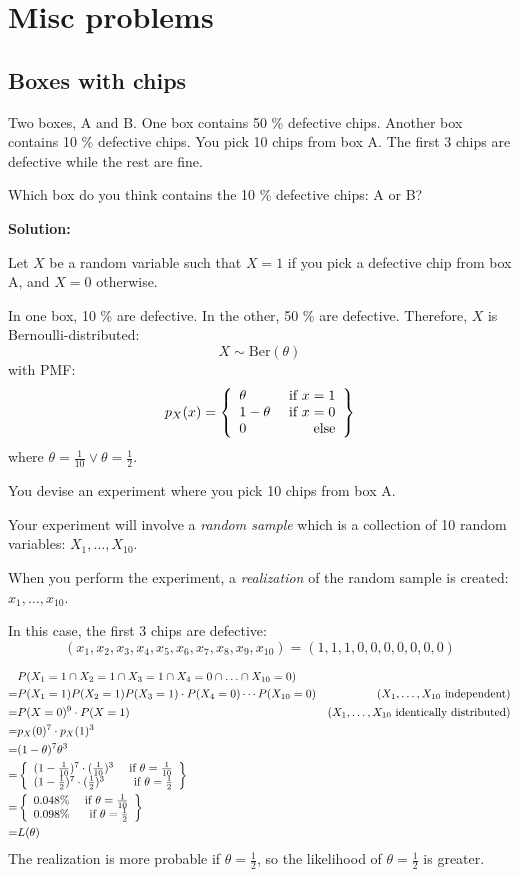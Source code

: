 \documentclass{article}
\begin{document}
\section{Misc problems}
\subsection{Boxes with chips}

Two boxes, A and B.
One box contains 50 \% defective chips. Another box contains 10 \% defective chips.
You pick 10 chips from box A. The first 3 chips are defective while the rest are fine.

Which box do you think contains the 10 \% defective chips: A or B?

\textbf{Solution:}

Let \(X\) be a random variable such that \(X=1\) if you pick a defective chip from box A, and \(X=0\) otherwise.

In one box, 10 \% are defective. In the other, 50 \% are defective. Therefore, \(X\) is Bernoulli-distributed:
\[X \sim \text{Ber}(\theta)\]
with PMF:
\[p_X(x) = \left\{\begin{array}{lr}\theta & \text{ if }x=1\\ 1-\theta & \text{ if }x=0 \\0 & \text{ else}\end{array}\right\}\]
where \(\theta=\frac{1}{10} \vee \theta=\frac{1}{2}\).

You devise an experiment where you pick 10 chips from box A.

Your experiment will involve a \textit{random sample} which is a collection of 10 random variables: \(X_1,\ldots,X_{10}\).

When you perform the experiment, a \textit{realization} of the random sample is created: \(x_1, \ldots, x_{10}\).

In this case, the first 3 chips are defective:
\[(x_1,x_2,x_3,x_4,x_5,x_6,x_7,x_8,x_9,x_{10})=(1,1,1,0,0,0,0,0,0,0)\]

\begin{align*}
     & P(X_1=1\cap X_2=1 \cap X_3=1\cap X_4=0 \cap\ldots \cap X_{10}=0) \\
    =& P(X_1=1)P(X_2=1)P(X_3=1)\cdot P(X_4=0) \cdots P(X_{10}=0) & (X_1,\ldots,X_{10}\text{ independent}) \\
    =& P(X=0)^9\cdot P(X=1) & (X_1,\ldots,X_{10}\text{ identically distributed}) \\
    =& p_X(0)^7\cdot p_X(1)^3 \\
    =& (1-\theta)^7\theta^3 \\
    =& \left\{\begin{array}{lr}(1-\frac{1}{10})^7\cdot (\frac{1}{10})^3 & \text{ if }\theta=\frac{1}{10}\\(1-\frac{1}{2})^7\cdot (\frac{1}{2})^3 & \text{ if }\theta=\frac{1}{2}\end{array}\right\} \\
    =& \left\{\begin{array}{lr}0.048 \% & \text{ if }\theta=\frac{1}{10}\\0.098 \% & \text{ if }\theta=\frac{1}{2}\end{array}\right\} \\
    =& L(\theta)
\end{align*}
The realization is more probable if \(\theta=\frac{1}{2}\), so the likelihood of \(\theta=\frac{1}{2}\) is greater.
\end{document}
